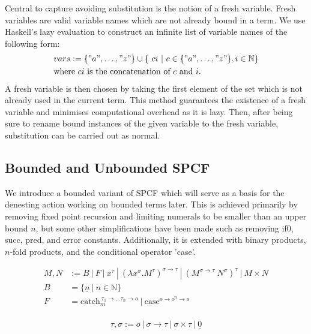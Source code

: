 \documentclass[12pt,a4paper]{report}
\theoremstyle{definition}
\theoremstyle{remark}
\begin{document}
Central to capture avoiding substitution is the notion of a fresh variable. Fresh variables are valid variable names which are not already bound in a term. We use Haskell's lazy evaluation to construct an infinite list of variable names of the following form: 
\[
\begin{split}
&vars := \{"a", \dots, "z"\} \cup \{\ ci\ |\ c \in \{"a", \dots, "z"\}, i \in \mathbb{N}\} \\
&\text{where $ci$ is the concatenation of $c$ and $i$.}
\end{split}
\]
A fresh variable is then chosen by taking the first element of the set which is not already used in the current term. This method guarantees the existence of a fresh variable and minimises computational overhead as it is lazy. Then, after being sure to rename bound instances of the given variable to the fresh variable, substitution can be carried out as normal.

\subsection{Bounded and Unbounded SPCF}
We introduce a bounded variant of SPCF which will serve as a basis for the denesting action working on bounded terms later. This is achieved primarily by removing fixed point recursion and limiting numerals to be smaller than an upper bound $n$, but some other simplifications have been made such as removing if0, succ, pred, and error constants. Additionally, it is extended with binary products, $n$-fold products, and the conditional operator 'case'.  

\begin{equation} \label{eq:bounded_spcf_grammar}
\begin{split}
    M,N &:= B\ |\ F\ |\ x^{\tau}\ |\ (\lambda x^{\sigma} .M^{\tau})^{\sigma \rightarrow \tau}\ |\ (M^{\sigma \rightarrow \tau} \ N^{\sigma})^{\tau}\ | \ M \times N\\
    B &= \{\underline{n}\ |\ n\in \mathbb{N}\}\\
    F &= \text{catch}_{m}^{\ \tau_1 \rightarrow \dots \tau_n \rightarrow o}\ |\ \text{case}^{o \rightarrow o^n \rightarrow o}\\
\end{split}
\end{equation}

\begin{equation}
    \tau , \sigma := o\ |\ \sigma \rightarrow \tau\ |\ \sigma \times \tau\ |\ \underline{0}
\end{equation}
\end{document}
